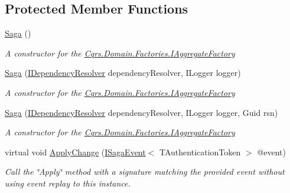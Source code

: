 \subsection*{Protected Member Functions}
\begin{DoxyCompactItemize}
\item 
\hyperlink{classCqrs_1_1Domain_1_1Saga_a1b6019cecbbf2572b64dd456cb5d91a2_a1b6019cecbbf2572b64dd456cb5d91a2}{Saga} ()
\begin{DoxyCompactList}\small\item\em A constructor for the \hyperlink{interfaceCqrs_1_1Domain_1_1Factories_1_1IAggregateFactory}{Cqrs.\+Domain.\+Factories.\+I\+Aggregate\+Factory} \end{DoxyCompactList}\item 
\hyperlink{classCqrs_1_1Domain_1_1Saga_affa39972d1946ab9f5d2474b17acbdd4_affa39972d1946ab9f5d2474b17acbdd4}{Saga} (\hyperlink{interfaceCqrs_1_1Configuration_1_1IDependencyResolver}{I\+Dependency\+Resolver} dependency\+Resolver, I\+Logger logger)
\begin{DoxyCompactList}\small\item\em A constructor for the \hyperlink{interfaceCqrs_1_1Domain_1_1Factories_1_1IAggregateFactory}{Cqrs.\+Domain.\+Factories.\+I\+Aggregate\+Factory} \end{DoxyCompactList}\item 
\hyperlink{classCqrs_1_1Domain_1_1Saga_acba7142c5e3ad568a60dc365fb7e8733_acba7142c5e3ad568a60dc365fb7e8733}{Saga} (\hyperlink{interfaceCqrs_1_1Configuration_1_1IDependencyResolver}{I\+Dependency\+Resolver} dependency\+Resolver, I\+Logger logger, Guid rsn)
\begin{DoxyCompactList}\small\item\em A constructor for the \hyperlink{interfaceCqrs_1_1Domain_1_1Factories_1_1IAggregateFactory}{Cqrs.\+Domain.\+Factories.\+I\+Aggregate\+Factory} \end{DoxyCompactList}\item 
virtual void \hyperlink{classCqrs_1_1Domain_1_1Saga_af8a1eddbadc8fc3fb69f18691f3b08ac_af8a1eddbadc8fc3fb69f18691f3b08ac}{Apply\+Change} (\hyperlink{interfaceCqrs_1_1Events_1_1ISagaEvent}{I\+Saga\+Event}$<$ T\+Authentication\+Token $>$ @event)
\begin{DoxyCompactList}\small\item\em Call the \char`\"{}\+Apply\char`\"{} method with a signature matching the provided {\itshape event}  without using event replay to this instance. \end{DoxyCompactList}\item 

\end{DoxyCompactItemize}
